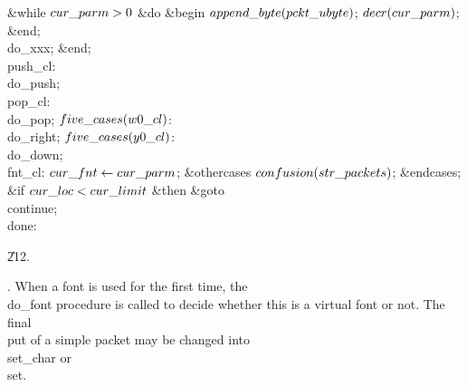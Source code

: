 \&{while} $\\{cur\_parm}>0$ \1\&{do}\6
\&{begin} $\\{append\_byte}(\\{pckt\_ubyte})$;\5
$\\{decr}(\\{cur\_parm})$;\6
\&{end};\2\6
\\{do\_xxx};\6
\&{end};\6
\4\\{push\_cl}: \\{do\_push};\6
\4\\{pop\_cl}: \\{do\_pop};\6
\4$\\{five\_cases}(\\{w0\_cl})$: \\{do\_right};\6
\4$\\{five\_cases}(\\{y0\_cl})$: \\{do\_down};\6
\4\\{fnt\_cl}: $\\{cur\_fnt}\gets\\{cur\_parm}$;\6
\4\&{othercases} $\\{confusion}(\\{str\_packets})$;\2\6
\&{endcases};\6
\&{if} $\\{cur\_loc}<\\{cur\_limit}$ \1\&{then}\5
\&{goto} \\{continue};\2\6
\4\\{done}: \par
\U212.\fi

. When a font is used for the first time, the \\{do\_font} procedure is
called to decide whether this is a virtual font or not.
The final \\{put} of a simple packet may be changed into \\{set\_char} or
\\{set}.


